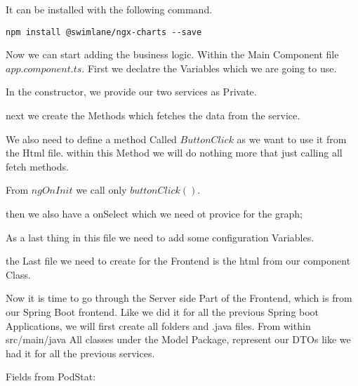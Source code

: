 It can be installed with the following command.
\begin{verbatim}
npm install @swimlane/ngx-charts --save
\end{verbatim}

Now we can start adding the business logic.
Within the Main Component file $app.component.ts$.
First we declatre the Variables which we are going to use.


In the constructor, we provide our two services as Private.

next we create the Methods which fetches the data from the service.


We also need to define a method Called $ButtonClick$ as we want to use it from the Html file. within this Method we will do nothing more that just calling all fetch methods.


From $ngOnInit$ we call only $buttonClick()$.

then we also have a onSelect which we need ot provice for the graph;

\newpage
As a last thing in this file we need to add some configuration Variables.



the Last file we need to create for the Frontend is the html from our component Class.


Now it is time to go through the Server side Part of the Frontend, which is from our Spring Boot frontend.
Like we did it for all the previous Spring boot Applications, we will first create all folders and .java files.
From within src/main/java
All classes under the Model Package, represent our DTOs like we had it for all the previous services.

Fields from PodStat:


